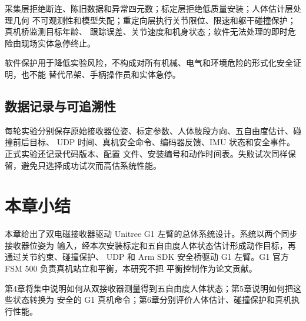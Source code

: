 采集层拒绝断连、陈旧数据和异常四元数；标定层拒绝低质量安装；人体估计层处理几何
不可观测性和模型失配；重定向层执行关节限位、限速和躯干碰撞保护；真机桥监测目标年龄、
跟踪误差、关节速度和机身状态；软件无法处理的即时危险由现场实体急停终止。

软件保护用于降低实验风险，不构成对所有机械、电气和环境危险的形式化安全证明，也不能
替代吊架、手柄操作员和实体急停。

\subsection{数据记录与可追溯性}
\label{subsec:ch3_traceability}

每轮实验分别保存原始接收器位姿、标定参数、人体肢段方向、五自由度估计、碰撞前后目标、
UDP 时间、真机安全命令、编码器反馈、IMU 状态和安全事件。正式实验还记录代码版本、配置
文件、安装编号和动作时间表。失败试次同样保留，避免只选择成功试次而高估系统性能。

\section{本章小结}
\label{sec:ch3_summary}

本章给出了双电磁接收器驱动 Unitree G1 左臂的总体系统设计。系统以两个同步接收器位姿为
输入，经本次安装标定和五自由度人体状态估计形成动作目标，再通过关节约束、碰撞保护、
UDP 和 Arm SDK 安全桥驱动 G1 左臂。G1 官方 FSM 500 负责真机站立和平衡，本研究不把
平衡控制作为论文贡献。

第4章将集中说明如何从双接收器测量得到五自由度人体状态；第5章说明如何把这些状态转换为
安全的 G1 真机命令；第6章分别评价人体估计、碰撞保护和真机执行性能。

